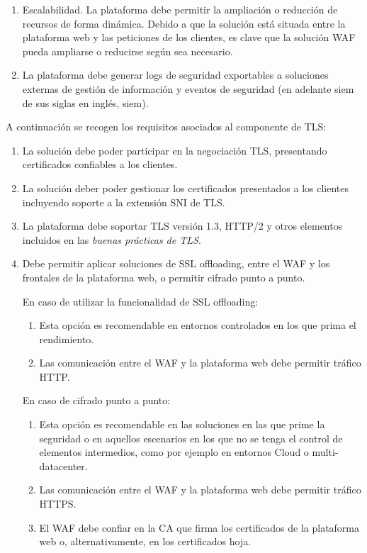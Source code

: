 \begin{enumerate}
  \item \label{req:escalado} Escalabilidad. La plataforma debe permitir la ampliación o reducción de recursos de forma dinámica. Debido a que la solución está situada entre la plataforma web y las peticiones de los clientes, es clave que la
    solución WAF pueda ampliarse o reducirse según sea necesario.

  \item La plataforma debe generar logs de seguridad exportables a soluciones externas de gestión de información y eventos de seguridad (en
    adelante \acrshort{siem} de sus siglas en inglés, \acrlong{siem}).
\end{enumerate}

\par A continuación se recogen los requisitos asociados al componente de TLS:
\begin{enumerate}
  \item \label{req:tls} La solución debe poder participar en la negociación TLS, presentando certificados confiables a los clientes.

  \item La solución deber poder gestionar los certificados presentados a los clientes incluyendo soporte a la extensión \acrshort{SNI} de TLS.

  \item La plataforma debe soportar TLS versión 1.3, HTTP/2 y otros elementos incluidos en las {\em buenas prácticas de TLS\cite{TLSBestPractices}}.

  \item Debe permitir aplicar soluciones de SSL offloading, entre el WAF y los frontales de la plataforma web, o permitir cifrado punto a punto.
    \par En caso de utilizar la funcionalidad de SSL offloading:
      \begin{enumerate}[label=\emph{\alph*})]
        \item Esta opción es recomendable en entornos controlados en los que prima el rendimiento.
        \item Las comunicación entre el WAF y la plataforma web debe permitir tráfico HTTP.
      \end{enumerate}
    \par En caso de cifrado punto a punto:
      \begin{enumerate}[label=\emph{\alph*})]
        \item Esta opción es recomendable en las soluciones en las que prime la seguridad o en aquellos escenarios en los que no se tenga el control de
          elementos intermedios, como por ejemplo en entornos Cloud o multi-datacenter.
        \item Las comunicación entre el WAF y la plataforma web debe permitir tráfico HTTPS.
        \item El WAF debe confiar en la CA que firma los certificados de la plataforma web o, alternativamente, en los certificados hoja.
      \end{enumerate}
\end{enumerate}


